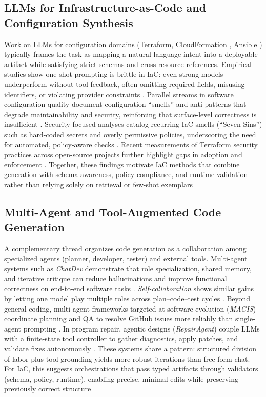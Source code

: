 \documentclass[manuscript,screen,nonacm]{acmart}
\begin{document}
\subsection{LLMs for Infrastructure-as-Code and Configuration Synthesis}
Work on LLMs for configuration domains (Terraform\cite{shirinkin2017getting}, CloudFormation \cite{tovmasyan2020mastering}, Ansible \cite{mcallister2017implementing}) typically frames the task as mapping a natural-language intent into a deployable artifact while satisfying strict schemas and cross-resource references. Empirical studies show one-shot prompting is brittle in IaC: even strong models underperform without tool feedback, often omitting required fields, misusing identifiers, or violating provider constraints \cite{kon2024iac}. Parallel streams in software configuration quality document configuration ``smells'' and anti-patterns that degrade maintainability and security, reinforcing that surface-level correctness is insufficient \cite{sharma2016does,schwarz2018code}. Security-focused analyses catalog recurring IaC smells (``Seven Sins'') such as hard-coded secrets and overly permissive policies, underscoring the need for automated, policy-aware checks \cite{opara2025chaos}. Recent measurements of Terraform security practices across open-source projects further highlight gaps in adoption and enforcement \cite{verdet2023exploring}. Together, these findings motivate IaC methods that combine generation with schema awareness, policy compliance, and runtime validation rather than relying solely on retrieval or few-shot exemplars

\subsection{Multi-Agent and Tool-Augmented Code Generation}
A complementary thread organizes code generation as a collaboration among specialized agents (planner, developer, tester) and external tools. Multi-agent systems such as \emph{ChatDev} demonstrate that role specialization, shared memory, and iterative critique can reduce hallucinations and improve functional correctness on end-to-end software tasks \cite{qian2023chatdev}. \emph{Self-collaboration} shows similar gains by letting one model play multiple roles across plan–code–test cycles \cite{dong2024self}. Beyond general coding, multi-agent frameworks targeted at software evolution (\emph{MAGIS}) coordinate planning and QA to resolve GitHub issues more reliably than single-agent prompting \cite{tao2024magis}. In program repair, agentic designs (\emph{RepairAgent}) couple LLMs with a finite-state tool controller to gather diagnostics, apply patches, and validate fixes autonomously \cite{bouzenia2024repairagent}. These systems share a pattern: structured division of labor plus tool-grounding yields more robust iterations than free-form chat. For IaC, this suggests orchestrations that pass typed artifacts through validators (schema, policy, runtime), enabling precise, minimal edits while preserving previously correct structure
\end{document}
